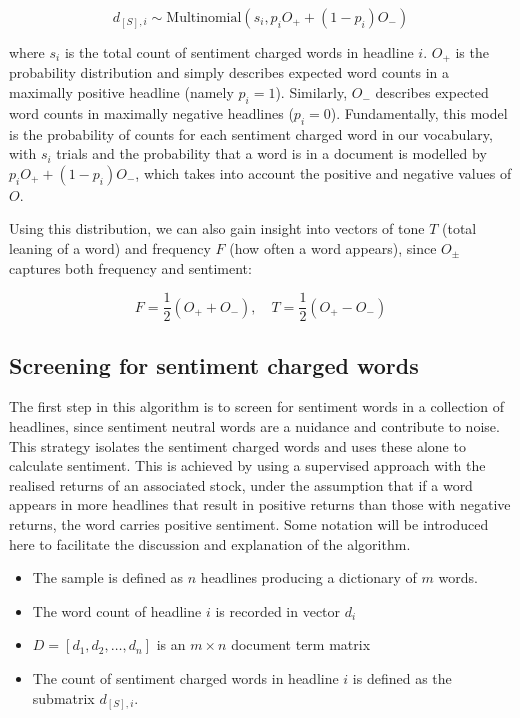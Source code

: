 \begin{equation}
d_{[S],i} \sim \text{Multinomial}(s_i, p_iO_+ + (1-p_i)O_-)
\label{multinom}
\end{equation}

\noindent
where $s_i$ is the total count of sentiment charged words in headline $i$. $O_+$ is the probability distribution and simply describes expected word counts in a maximally positive headline (namely $p_i = 1$). Similarly, $O_-$ describes expected word counts in maximally negative headlines ($p_i = 0$). Fundamentally, this model is the probability of counts for each sentiment charged word in our vocabulary, with $s_i$ trials and the probability that a word is in a document is modelled by $p_iO_+ + (1-p_i)O_-$, which takes into account the positive and negative values of $O$.

Using this distribution, we can also gain insight into vectors of tone $T$ (total leaning of a word) and frequency $F$ (how often a word appears), since $O_\pm$ captures both frequency and sentiment:

\begin{equation}
F = \frac{1}{2}(O_+ + O_-), \quad T= \frac{1}{2}(O_+ - O_-)
\end{equation}

\subsection{Screening for sentiment charged words}
\label{screen-sentiment}
The first step in this algorithm is to screen for sentiment words in a collection of headlines, since sentiment neutral words are a nuidance and contribute to noise. This strategy isolates the sentiment charged words and uses these alone to calculate sentiment. This is achieved by using a supervised approach with the realised returns of an associated stock, under the assumption that if a word appears in more headlines that result in positive returns than those with negative returns, the word carries positive sentiment. Some notation will be introduced here to facilitate the discussion and explanation of the algorithm.
\begin{itemize}
      \item The sample is defined as $n$ headlines producing a dictionary of $m$ words.
      \item The word count of headline $i$ is recorded in vector $d_i$
      \item $D = [d_1, d_2, \dots, d_n]$ is an $m \times n$ document term matrix
      \item The count of sentiment charged words in headline $i$ is defined as the submatrix $d_{[S],i}$.
\end{itemize}

